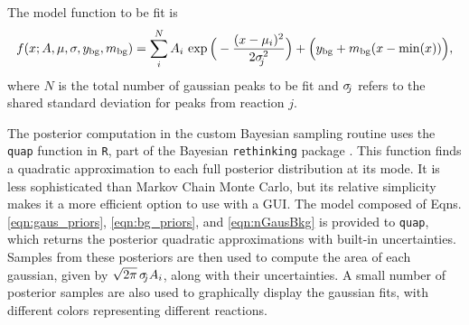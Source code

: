 The model function to be fit is
\begin{equation}
    f(x;A,\mu,\sigma,y_{\mathrm{bg}},m_{\mathrm{bg}}) = \sum_{i}^{N} A_{i} \, \exp \Big( -\frac{(x-\mu_{i})^{2}}{2\sigma_{\hspace{-0.08cm} j}^{2}} \Big) + \Big(y_{\mathrm{bg}} + m_{\mathrm{bg}} (x - \mathrm{min}(x))\Big), \label{eqn:nGausBkg}
\end{equation}
where $N$ is the total number of gaussian peaks to be fit and $\sigma_{\hspace{-0.08cm} j}$ refers to the shared standard deviation for peaks from reaction $j$.

The posterior computation in the custom Bayesian sampling routine uses the \texttt{quap} function in \texttt{R}, part of the Bayesian \texttt{rethinking} package \cite{Rethinking}. This function finds a quadratic approximation to each full posterior distribution at its mode. It is less sophisticated than Markov Chain Monte Carlo, but its relative simplicity makes it a more efficient option to use with a GUI. The model composed of Eqns. \ref{eqn:gaus_priors}, \ref{eqn:bg_priors}, and \ref{eqn:nGausBkg} is provided to \texttt{quap}, which returns the posterior quadratic approximations with built-in uncertainties. Samples from these posteriors are then used to compute the area of each gaussian, given by $\sqrt{2\pi} \, \sigma_{\hspace{-0.08cm} j} A_{i}$, along with their uncertainties. A small number of posterior samples are also used to graphically display the gaussian fits, with different colors representing different reactions.

